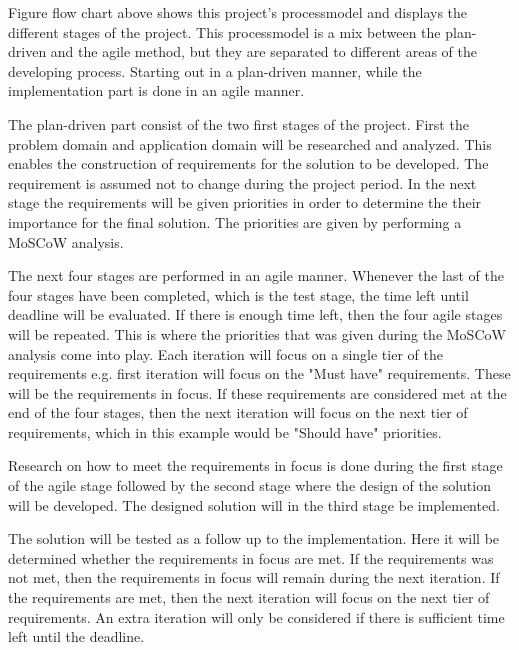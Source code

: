 Figure  flow chart above shows this project's processmodel and displays the different stages of the project. This processmodel is a mix between the plan-driven and the agile method, but they are separated to different areas of the developing process. Starting out in a plan-driven manner, while the implementation part is done in an agile manner.

The plan-driven part consist of the two first stages of the project. First the problem domain and application domain will be researched and analyzed. This enables the construction of requirements for the solution to be developed. The requirement is assumed not to change during the project period. In the next stage the requirements will be given priorities in order to determine the their importance for the final solution. The priorities are given by performing a MoSCoW analysis.

The next four stages are performed in an agile manner. Whenever the last of the four stages have been completed, which is the test stage, the time left until deadline will be evaluated. If there is enough time left, then the four agile stages will be repeated. This is where the priorities that was given during the MoSCoW analysis come into play. Each iteration will focus on a single tier of the requirements e.g. first iteration will focus on the "Must have" requirements. These will be the requirements in focus. If these requirements are considered met at the end of the four stages, then the next iteration will focus on the next tier of requirements, which in this example would be "Should have" priorities.

Research on how to meet the requirements in focus is done during the first stage of the agile stage followed by the second stage where the design of the solution will be developed. The designed solution will in the third stage be implemented.

The solution will be tested as a follow up to the implementation. Here it will be determined whether the requirements in focus are met. If the requirements was not met, then the requirements in focus will remain during the next iteration. If the requirements are met, then the next iteration will focus on the next tier of requirements. An extra iteration will only be considered if there is sufficient time left until the deadline.

